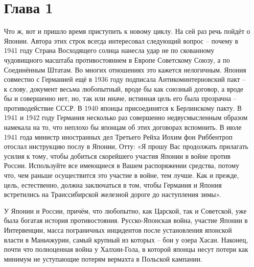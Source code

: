 \chapter{Глава 1}
Что ж, вот и пришло время приступить к новому циклу. На сей раз речь пойдёт о Японии. Автора этих строк всегда интересовал следующий вопрос – почему в 1941 году Страна Восходящего солнца нанесла удар не по скованному чудовищного масштаба противостоянием в Европе Советскому Союзу, а по Соединённым Штатам. Во многих отношениях это кажется нелогичным. Япония совместно с Германией ещё в 1936 году подписала Антикоминтерновский пакт – к слову, документ весьма любопытный, вроде бы как союзный договор, а вроде бы и совершенно нет, но, так или иначе, истинная цель его была прозрачна – противодействие СССР. В 1940 японцы присоединятся к Берлинскому пакту. В 1941 и 1942 году Германия несколько раз совершенно недвусмысленным образом намекала на то, что неплохо бы японцам об этих договорах вспомнить. В июле 1941 года министр иностранных дел Третьего Рейха Иохим фон Риббентроп отослал инструкцию послу в Японии, Отту: «Я прошу Вас продолжать прилагать усилия к тому, чтобы добиться скорейшего участия Японии в войне против России. Используйте все имеющиеся в Вашем распоряжении средства, потому что, чем раньше осуществится это участие в войне, тем лучше. Как и прежде, цель, естественно, должна заключаться в том, чтобы Германия и Япония встретились на Транссибирской железной дороге до наступления зимы».


У Японии и России, причём, что любопытно, как Царской, так и Советской, уже была богатая история противостояния. Русско-Японская война, участие Японии в Интервенции, масса пограничных инцидентов после установления японской власти в Маньчжурии, самый крупный из которых – бои у озера Хасан. Наконец, почти что полноценная война у Халхин-Гола, в которой японцы несут потери как минимум не уступающие потерям вермахта в Польской кампании. 

